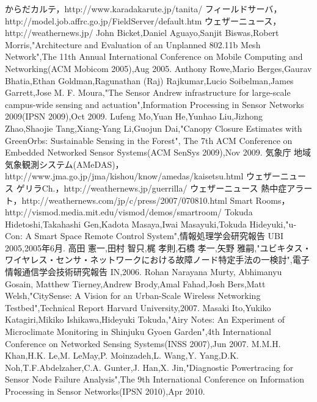 \newpage

\renewcommand{\bibname}{参考文献}

\begin{thebibliography}{1}
からだカルテ，http://www.karadakarute.jp/tanita/
フィールドサーバ，http://model.job.affrc.go.jp/FieldServer/default.htm
ウェザーニュース，http://weathernews.jp/
John Bicket,Daniel Aguayo,Sanjit Biswas,Robert Morris,"Architecture and Evaluation of an Unplanned 802.11b Mesh Network",The 11th Annual International Conference on Mobile Computing and Networking(ACM Mobicom 2005),Aug 2005.
Anthony Rowe,Mario Berges,Gaurav Bhatia,Ethan Goldman,Ragunathan (Raj) Rajkumar,Lucio Soibelman,James Garrett,Jose M. F. Moura,"The Sensor Andrew infrastructure for large-scale campus-wide sensing and actuation",Information Processing in Sensor Networks 2009(IPSN 2009),Oct 2009. 
Lufeng Mo,Yuan He,Yunhao Liu,Jizhong Zhao,Shaojie Tang,Xiang-Yang Li,Guojun Dai,"Canopy Closure Estimates with GreenOrbs: Sustainable Sensing in the Forest", The 7th ACM Conference on Embedded Networked Sensor Systems(ACM SenSys 2009),Nov 2009.
気象庁 地域気象観測システム(AMeDAS)，\\ http://www.jma.go.jp/jma/kishou/know/amedas/kaisetsu.html
ウェザーニュース ゲリラCh.，http://weathernews.jp/guerrilla/
ウェザーニュース 熱中症アラート，http://weathernews.com/jp/c/press/2007/070810.html
Smart Rooms，http://vismod.media.mit.edu/vismod/demos/smartroom/
Tokuda Hidetoshi,Takahashi Gen,Kadota Masaya,Iwai Masayuki,Tokuda Hideyuki,"u-Con: A Smart Space Remote Control System",情報処理学会研究報告 UBI 2005,2005年6月.
高田 憲一,田村 智只,梶 孝則,石橋 孝一,矢野 雅嗣,"ユビキタス・ワイヤレス・センサ・ネットワークにおける故障ノード特定手法の一検討",電子情報通信学会技術研究報告 IN,2006.
Rohan Narayana Murty, Abhimanyu Gosain, Matthew Tierney,Andrew Brody,Amal Fahad,Josh Bers,Matt Welsh,"CitySense: A Vision for an Urban-Scale Wireless Networking Testbed",Technical Report Harvard University,2007.
Masaki Ito,Yukiko Katagiri,Mikiko Ishikawa,Hideyuki Tokuda,"Airy Notes: An Experiment of Microclimate Monitoring in Shinjuku Gyoen Garden",4th International Conference on Networked Sensing Systems(INSS 2007),Jun 2007.
M.M.H. Khan,H.K. Le,M. LeMay,P. Moinzadeh,L. Wang,Y. Yang,D.K. Noh,T.F.Abdelzaher,C.A. Gunter,J. Han,X. Jin,"Diagnostic Powertracing for Sensor Node Failure Analysis",The 9th International Conference on Information Processing in Sensor Networks(IPSN 2010),Apr 2010.
\end{thebibliography}
